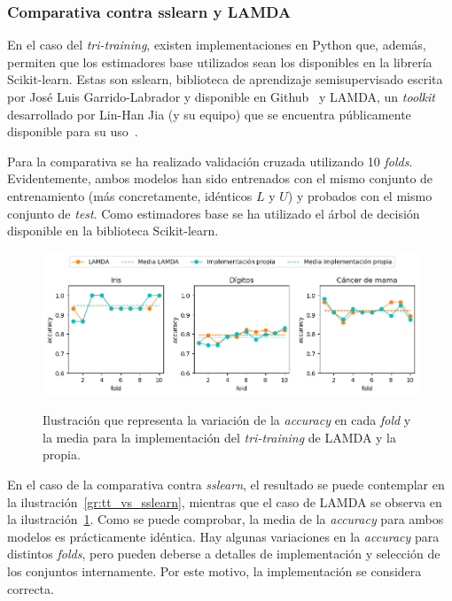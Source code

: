 \subsubsection{Comparativa contra sslearn y LAMDA}

En el caso del \textit{tri-training}, existen implementaciones en Python que, además, permiten que los estimadores base utilizados sean los disponibles en la librería Scikit-learn. Estas son sslearn, biblioteca de aprendizaje semisupervisado escrita por José Luis Garrido-Labrador y disponible en Github~\cite{sslearnRepo} y LAMDA, un \textit{toolkit}~\cite{lamdasslPaper} desarrollado por Lin-Han Jia (y su equipo) que se encuentra públicamente disponible para su uso~\cite{lamdasslRepo}.

Para la comparativa se ha realizado validación cruzada utilizando 10 \textit{folds}. Evidentemente, ambos modelos han sido entrenados con el mismo conjunto de entrenamiento (más concretamente, idénticos $L$ y $U$) y probados con el mismo conjunto de \textit{test}. Como estimadores base se ha utilizado el árbol de decisión disponible en la biblioteca Scikit-learn.

\begin{figure}[h]
	\caption[\textit{Tri-training}: comparativa contra LAMDA]{Ilustración que representa la variación de la \textit{accuracy} en cada \textit{fold} y la media para la implementación del \textit{tri-training} de LAMDA y la propia.}
	\centering
	\includegraphics[scale=0.62]{../img/memoria/5_tritraining_lamda}
	\label{gr:tt_vs_lamda}
\end{figure}

En el caso de la comparativa contra \textit{sslearn}, el resultado se puede contemplar en la ilustración~\ref{gr:tt_vs_sslearn}, mientras que el caso de LAMDA se observa en la ilustración~\ref{gr:tt_vs_lamda}. Como se puede comprobar, la media de la \textit{accuracy} para ambos modelos es prácticamente idéntica. Hay algunas variaciones en la \textit{accuracy} para distintos \textit{folds}, pero pueden deberse a detalles de implementación y selección de los conjuntos internamente. Por este motivo, la implementación se considera correcta.

